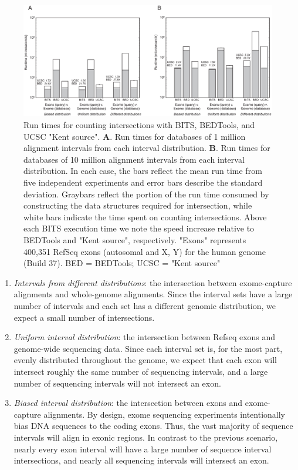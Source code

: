 \documentclass{bioinfo}
\begin{document}
\begin{figure}[btp]
	\centering
	\includegraphics[width=7in]{figures/seq-counting.eps}
	\caption[]{Run times for counting intersections with 
	BITS, BEDTools, and UCSC "Kent source".  \textbf{A}. Run times for databases
	of 1 million alignment intervals from each interval distribution.
	\textbf{B}.  Run times for databases of 10 million alignment intervals from
	each interval distribution.  In each case, the bars reflect the mean run
	time from five independent experiments and error bars describe the standard
	deviation.  Graybars reflect the portion of the run time consumed by
	constructing the data structures required for intersection, while white bars
	indicate the time spent on counting intersections.  Above each BITS
	execution time we note the speed increase relative to BEDTools and "Kent
	source", respectively. "Exons" represents 400,351 RefSeq exons (autosomal
	and X, Y) for the human genome (Build 37).  BED = BEDTools; UCSC = "Kent
	source"}
	\label{seq-counting}
\end{figure}

\begin{enumerate}
	\item {\em Intervals from different distributions}:
	the intersection between exome-capture alignments and whole-genome
	alignments. Since the interval sets have a large number of intervals and
	each set has a different genomic distribution, we expect a small number of
	intersections.
	
	\item {\em Uniform interval distribution}:
	the intersection between Refseq exons and genome-wide sequencing data.
	Since each interval set is, for the most part, evenly distributed throughout
	the genome, we expect that each exon will intersect roughly the same number
	of sequencing intervals, and a large number of sequencing intervals will not
	intersect an exon.

	\item {\em Biased interval distribution}:
	the intersection between exons and exome-capture alignments. By design, 
	exome sequencing experiments intentionally bias DNA sequences to the coding
	exons. Thus, the vast majority of sequence intervals will align in exonic
	regions. In contrast to the previous scenario, nearly every exon interval
	will have a large number of sequence interval intersections, and nearly all
	sequencing intervals will intersect an exon.
\end{enumerate}
        
\end{document}
